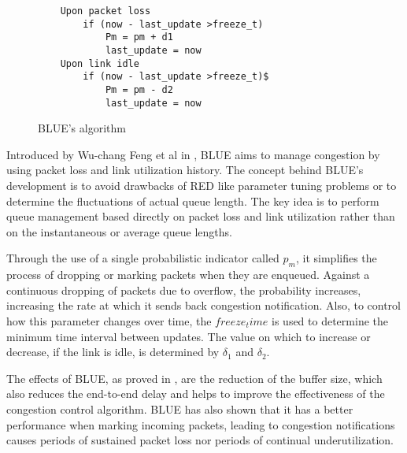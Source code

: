 \begin{wrapfigure}{r}{0.5\textwidth}
    \centering
	\begin{verbatim}
	Upon packet loss
	    if (now - last_update >freeze_t)
	        Pm = pm + d1
	        last_update = now
	Upon link idle
	    if (now - last_update >freeze_t)$
	        Pm = pm - d2
	        last_update = now
  	\end{verbatim}
    \caption{BLUE's algorithm}
    \label{fig:BLUEAlg}
\end{wrapfigure}

Introduced by Wu-chang Feng et al in \cite{FengBLUEAQM}, BLUE aims to manage
congestion by using packet loss and link utilization history. The concept
behind BLUE's development is to avoid drawbacks of RED like parameter tuning
problems or to determine the fluctuations of actual queue length. The key idea
is to perform queue management based directly on packet loss and link
utilization rather than on the instantaneous or average queue lengths.

Through the use of a single probabilistic indicator called $p_m$, it
simplifies the process of dropping or marking packets when they are enqueued.
Against a continuous dropping of packets due to overflow, the probability
increases, increasing the rate at which it sends back congestion notification.
Also, to control how this parameter changes over time, the
$freeze_time$ is used to determine the minimum time interval between
updates.  The value on which to increase or decrease, if the link is idle, is
determined by $\delta_1$ and $\delta_2$.

The effects of BLUE, as proved in \cite{FengBLUEAQM}, are the reduction of the
buffer size, which also reduces the end-to-end delay and helps to improve the
effectiveness of the congestion control algorithm. BLUE has also shown that it
has a better performance when marking incoming packets, leading to congestion
notifications causes periods of sustained packet loss nor periods of continual
underutilization.
